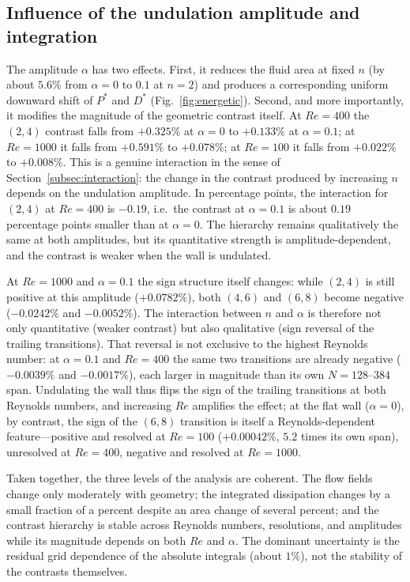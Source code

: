 \subsection{Influence of the undulation amplitude and integration}
\label{subsec:amplitude}

The amplitude $\alpha$ has two effects. First, it reduces the fluid area at fixed $n$ (by about $5.6\%$ from $\alpha=0$ to $0.1$ at $n=2$) and produces a corresponding uniform downward shift of $P^*$ and $D^*$ (Fig.~\ref{fig:energetic}). Second, and more importantly, it modifies the magnitude of the geometric contrast itself. At $Re=400$ the $(2,4)$ contrast falls from $+0.325\%$ at $\alpha=0$ to $+0.133\%$ at $\alpha=0.1$; at $Re=1000$ it falls from $+0.591\%$ to $+0.078\%$; at $Re=100$ it falls from $+0.022\%$ to $+0.008\%$. This is a genuine interaction in the sense of Section~\ref{subsec:interaction}: the change in the contrast produced by increasing $n$ depends on the undulation amplitude. In percentage points, the interaction for $(2,4)$ at $Re=400$ is $-0.19$, i.e.\ the contrast at $\alpha=0.1$ is about $0.19$ percentage points smaller than at $\alpha=0$. The hierarchy remains qualitatively the same at both amplitudes, but its quantitative strength is amplitude-dependent, and the contrast is weaker when the wall is undulated.

At $Re=1000$ and $\alpha=0.1$ the sign structure itself changes: while $(2,4)$ is still positive at this amplitude ($+0.0782\%$), both $(4,6)$ and $(6,8)$ become negative ($-0.0242\%$ and $-0.0052\%$). The interaction between $n$ and $\alpha$ is therefore not only quantitative (weaker contrast) but also qualitative (sign reversal of the trailing transitions). That reversal is not exclusive to the highest Reynolds number: at $\alpha=0.1$ and $Re=400$ the same two transitions are already negative ($-0.0039\%$ and $-0.0017\%$), each larger in magnitude than its own $N=128$--$384$ span. Undulating the wall thus flips the sign of the trailing transitions at both Reynolds numbers, and increasing $Re$ amplifies the effect; at the flat wall ($\alpha=0$), by contrast, the sign of the $(6,8)$ transition is itself a Reynolds-dependent feature---positive and resolved at $Re=100$ ($+0.00042\%$, $5.2$ times its own span), unresolved at $Re=400$, negative and resolved at $Re=1000$.

Taken together, the three levels of the analysis are coherent. The flow fields change only moderately with geometry; the integrated dissipation changes by a small fraction of a percent despite an area change of several percent; and the contrast hierarchy is stable across Reynolds numbers, resolutions, and amplitudes while its magnitude depends on both $Re$ and $\alpha$. The dominant uncertainty is the residual grid dependence of the absolute integrals (about $1\%$), not the stability of the contrasts themselves.

